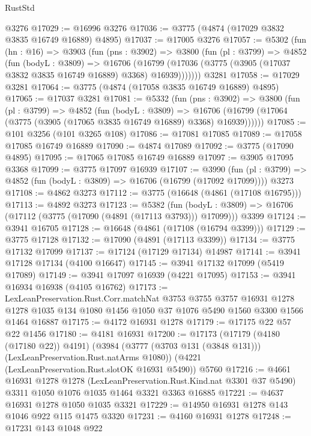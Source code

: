 \begin{lexlean}{RustStd}
\begin{coremodule}
{\begin{coremodule}
{{{{{{{{{{{{{{{{{{{{{{{{{{{{{{{    @3276
@17029 := @16996 @3276
@17036 := @3775 (@4874 (@17029 @3832 @3835 @16749 @16889) @4895)
@17037 := @17005 @3276
@17057 := @5302
    (fun (hn : @16) =>
    @3903
      (fun (pns : @3902) =>
      @3800
        (fun (pl : @3799) =>
        @4852
          (fun (bodyL : @3809) =>
          @16706
            (@16799 (@17036 (@3775 (@3905 (@17037 @3832 @3835 @16749 @16889) @3368) @16939)))))))
    @3281
@17058 := @17029 @3281
@17064 := @3775 (@4874 (@17058 @3835 @16749 @16889) @4895)
@17065 := @17037 @3281
@17081 := @5332
    (fun (pns : @3902) =>
    @3800
      (fun (pl : @3799) =>
      @4852
        (fun (bodyL : @3809) =>
        @16706 (@16799 (@17064 (@3775 (@3905 (@17065 @3835 @16749 @16889) @3368) @16939))))))
@17085 := @101 @3256 (@101 @3265 @108)
@17086 := @17081 @17085
@17089 := @17058 @17085 @16749 @16889
@17090 := @4874 @17089
@17092 := @3775 (@17090 @4895)
@17095 := @17065 @17085 @16749 @16889
@17097 := @3905 @17095 @3368
@17099 := @3775 @17097 @16939
@17107 := @3990
    (fun (pl : @3799) => @4852 (fun (bodyL : @3809) => @16706 (@16799 (@17092 @17099))))
    @3273
@17108 := @4862 @3273
@17112 := @3775 (@16648 (@4861 (@17108 @16795)))
@17113 := @4892 @3273
@17123 := @5382
    (fun (bodyL : @3809) => @16706 (@17112 (@3775 (@17090 (@4891 (@17113 @3793))) @17099)))
    @3399
@17124 := @3941 @16705
@17128 := @16648 (@4861 (@17108 (@16794 @3399)))
@17129 := @3775 @17128
@17132 := @17090 (@4891 (@17113 @3399))
@17134 := @3775 @17132 @17099
@17137 := @17124 (@17129 @17134) @14987
@17141 := @3941 @17128 @17134 (@4100 @16647)
@17145 := @3941 @17132 @17099 (@5419 @17089)
@17149 := @3941 @17097 @16939 (@4221 @17095)
@17153 := @3941 @16934 @16938 (@4105 @16762)
@17173 := LexLeanPreservation.Rust.Corr.matchNat
    @3753
    @3755
    @3757
    @16931
    @1278
    @1278
    @1035
    @134
    @1080
    @1456
    @1050
    @37
    @1076
    @5490
    @1560
    @3300
    @1566
    @1464
    @16887
@17175 := @4172 @16931 @1278
@17179 := @17175 @22 @57 @22 @1456
@17180 := @4181 @16931
@17200 := @17173
    (@17179 (@4180 (@17180 @22)) @4191)
    (@3984 (@3777 (@3703 @131 (@3848 @131))) (LexLeanPreservation.Rust.natArms @1080))
    (@4221 (LexLeanPreservation.Rust.slotOK @16931 @5490))
    @5760
@17216 := @4661
    @16931
    @1278
    @1278
    (LexLeanPreservation.Rust.Kind.nat @3301 @37 @5490)
    @3311
    @1050
    @1076
    @1035
    @1464
    @3321
    @3363
    @16885
@17221 := @4637 @16931 @1278 @1050 @1035 @3321
@17229 := @14950 @16931 @1278 @143 @1046 @922 @115 @1475 @3320
@17231 := @4160 @16931 @1278
@17248 := @17231
    @143
    @1048
    @922
}}}}}}}}}}}}}}}}}}}}}}}}}}}}}}}
\end{coremodule}}
\end{coremodule}
\end{lexlean}
